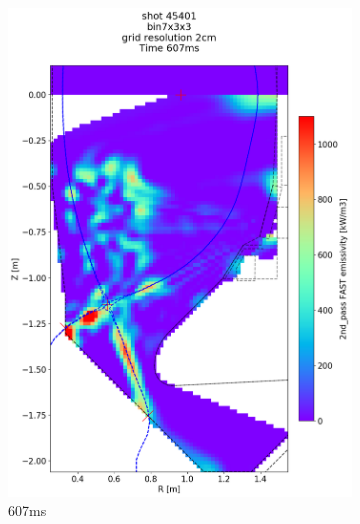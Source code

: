\begin{figure}
\begin{subfigure}{0.395\linewidth}
         \includegraphics[trim={75 95 0 195},clip,width=\textwidth]{Chapters/chapter2/figs/IRVB-MASTU_shot-45401_export_86.png}
         \vspace*{-6.5mm}
         \caption{607ms}
         \label{fig:45401_export2_2}
     \end{subfigure}
     \begin{subfigure}{0.395\linewidth}
         \centering

\end{subfigure}
\end{figure}
